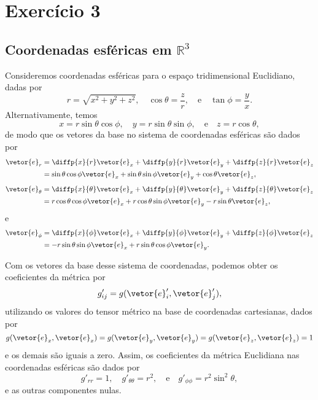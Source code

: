 \section*{Exercício 3}
\subsection*{Coordenadas esféricas em \(\mathbb{R}^3\)}
Consideremos coordenadas esféricas para o espaço tridimensional Euclidiano, dadas por
\begin{equation*}
    r = \sqrt{x^2 + y^2 + z^2},\quad \cos\theta = \frac{z}{r},\quad\text{e}\quad\tan\phi=\frac{y}{x}.
\end{equation*}
Alternativamente, temos
\begin{equation*}
    x = r\sin\theta\cos\phi,\quad y = r\sin\theta\sin\phi,\quad\text{e}\quad z = r\cos\theta,
\end{equation*}
de modo que os vetores da base no sistema de coordenadas esféricas são dados por
\begin{align*}
    \vetor{e}_r &= \diffp{x}{r}\vetor{e}_x + \diffp{y}{r}\vetor{e}_y + \diffp{z}{r}\vetor{e}_z\\
                &= \sin\theta\cos\phi\vetor{e}_x + \sin\theta\sin\phi\vetor{e}_y + \cos\theta \vetor{e}_z,
\end{align*}
\begin{align*}
    \vetor{e}_\theta &= \diffp{x}{\theta}\vetor{e}_x + \diffp{y}{\theta}\vetor{e}_y + \diffp{z}{\theta}\vetor{e}_z \\
                   &= r\cos\theta\cos\phi \vetor{e}_x + r\cos\theta\sin\phi\vetor{e}_y - r\sin\theta\vetor{e}_z,
\end{align*}
e
\begin{align*}
    \vetor{e}_\phi &= \diffp{x}{\phi}\vetor{e}_x + \diffp{y}{\phi}\vetor{e}_y + \diffp{z}{\phi}\vetor{e}_z\\
                   &= -r\sin\theta\sin\phi \vetor{e}_x + r\sin\theta\cos\phi\vetor{e}_y.
\end{align*}

Com os vetores da base desse sistema de coordenadas, podemos obter os coeficientes da métrica por
\begin{equation*}
    g'_{ij} = g(\vetor{e}_i', \vetor{e}_j'),
\end{equation*}
utilizando os valores do tensor métrico na base de coordenadas cartesianas, dados por
\begin{equation*}
    g(\vetor{e}_x, \vetor{e}_x) = g(\vetor{e}_y, \vetor{e}_y) = g(\vetor{e}_z, \vetor{e}_z) = 1
\end{equation*}
e os demais são iguais a zero. Assim, os coeficientes da métrica Euclidiana nas coordenadas esféricas são dados por
\begin{equation*}
    g'_{rr} = 1, \quad g'_{\theta\theta} = r^2, \quad\text{e}\quad g'_{\phi\phi} = r^2\sin^2\theta,
\end{equation*}
e as outras componentes nulas.

